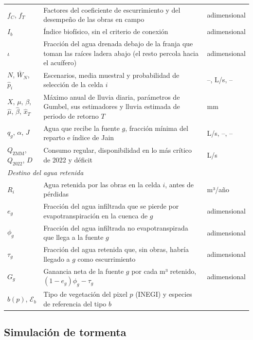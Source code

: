 \begin{table}[H]
\begin{tabularx}{\linewidth}{lXl}
$f_C$, $f_T$ & Factores del coeficiente de escurrimiento y del desempeño de las obras en campo & adimensional \\
$I_b$ & Índice biofísico, sin el criterio de conexión & adimensional \\
$\iota$ & Fracción del agua drenada debajo de la franja que toman las raíces ladera abajo (el resto percola hacia el acuífero) & adimensional \\
$N$, $\bar W_N$, $\hat p_i$ & Escenarios, media muestral y probabilidad de selección de la celda $i$ & --, L/s, -- \\
$X$, $\mu$, $\beta$, $\hat\mu$, $\hat\beta$, $\hat x_T$ & Máximo anual de lluvia diaria, parámetros de Gumbel, sus estimadores y lluvia estimada de periodo de retorno $T$ & mm \\
$q_g$, $\alpha$, $J$ & Agua que recibe la fuente $g$, fracción mínima del reparto e índice de Jain & L/s, --, -- \\
$Q_{\text{ZMM}}$, $Q_{2022}$, $D$ & Consumo regular, disponibilidad en lo más crítico de 2022 y déficit & L/s \\
\multicolumn{3}{l}{\textit{Destino del agua retenida}}\\
$R_i$ & Agua retenida por las obras en la celda $i$, antes de pérdidas & m³/año \\
$e_g$ & Fracción del agua infiltrada que se pierde por evapotranspiración en la cuenca de $g$ & adimensional \\
$\phi_g$ & Fracción del agua infiltrada no evapotranspirada que llega a la fuente $g$ & adimensional \\
$\tau_g$ & Fracción del agua retenida que, sin obras, habría llegado a $g$ como escurrimiento & adimensional \\
$G_g$ & Ganancia neta de la fuente $g$ por cada m³ retenido, $(1-e_g)\phi_g-\tau_g$ & adimensional \\
$b(p)$, $\mathcal E_b$ & Tipo de vegetación del pixel $p$ (INEGI) y especies de referencia del tipo $b$ & \\
\bottomrule
\end{tabularx}
\end{table}

\subsection{Simulación de tormenta}

